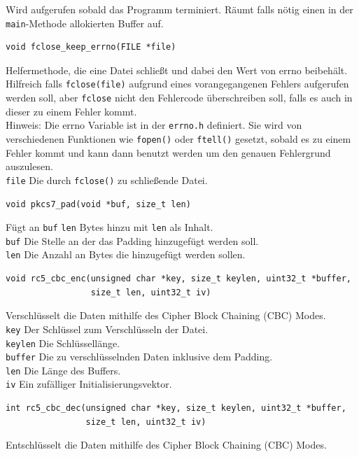 \documentclass[course=erap]{aspdoc}
\begin{document}
Wird aufgerufen sobald das Programm terminiert.
Räumt falls nötig einen in der \texttt{main}-Methode allokierten Buffer auf.\\
\begin{verbatim}
void fclose_keep_errno(FILE *file)
\end{verbatim}
Helfermethode, die eine Datei schließt und dabei den Wert von errno beibehält.
Hilfreich falls \texttt{fclose(file)} aufgrund eines vorangegangenen Fehlers aufgerufen werden
soll, aber \texttt{fclose} nicht den Fehlercode überschreiben soll, falls es auch in dieser zu
einem Fehler kommt.\\
Hinweis: Die errno Variable ist in der \texttt{errno.h} definiert.
Sie wird von verschiedenen Funktionen wie \texttt{fopen()} oder \texttt{ftell()} gesetzt, sobald
es zu einem Fehler kommt und kann dann benutzt werden um den genauen Fehlergrund auszulesen.\\
[1.5mm]
\texttt{file} Die durch \texttt{fclose()} zu schließende Datei.\\
\begin{verbatim}
void pkcs7_pad(void *buf, size_t len)
\end{verbatim}
Fügt an \texttt{buf} \texttt{len} Bytes hinzu mit \texttt{len} als Inhalt.\\[1.5mm]
\texttt{buf} Die Stelle an der das Padding hinzugefügt werden soll.\\
\texttt{len} Die Anzahl an Bytes die hinzugefügt werden sollen.\\
\begin{verbatim}
void rc5_cbc_enc(unsigned char *key, size_t keylen, uint32_t *buffer,
                 size_t len, uint32_t iv)
\end{verbatim}
Verschlüsselt die Daten mithilfe des Cipher Block Chaining (CBC) Modes.\\[1.5mm]
\texttt{key} Der Schlüssel zum Verschlüsseln der Datei.\\
\texttt{keylen} Die Schlüssellänge.\\
\texttt{buffer} Die zu verschlüsselnden Daten inklusive dem Padding.\\
\texttt{len} Die Länge des Buffers.\\
\texttt{iv} Ein zufälliger Initialisierungsvektor.\\
\begin{verbatim}
int rc5_cbc_dec(unsigned char *key, size_t keylen, uint32_t *buffer,
                size_t len, uint32_t iv)
\end{verbatim}
Entschlüsselt die Daten mithilfe des Cipher Block Chaining (CBC) Modes.\\[1.5mm]
\end{document}
